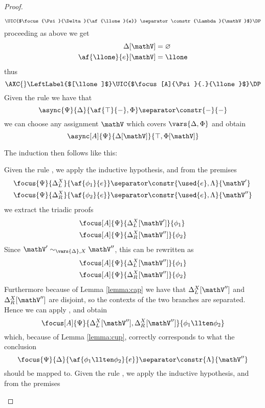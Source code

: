 \begin{proof}
\begin{itemize}
$$			\UIC{$\focus{\Psi}{\Delta}{\af{\llone}{e}} \separator \constr{\Lambda}{\mathV}$}
			\DP
			$$
			proceeding as above we get
			\begin{align*}
				\Delta[\mathV] &= \varnothing \\
				\af{\llone}{e}[\mathV] &= \llone
			\end{align*}
			thus
			$$
			\AXC{}
			\LeftLabel{$[\llone]$}
			\UIC{$\focus[A]{\Psi}{.}{\llone}$}
			\DP
			$$
		\indCase{\displaytop} Given the rule \derRule{\displaytop} we have that
			$$ \async{\Psi}{\Delta}{\af{\top}{-}, \Phi} \separator \constr{-}{-} $$
			we can choose any assignment $\mathV$ which covers $\vars{\Delta, \Phi}$ and obtain
			$$ \async[A]{\Psi}{\Delta[\mathV]}{\top, \Phi[\mathV]} $$
	\end{itemize}
	The induction then follows like this:
	\begin{itemize}
		\indCase{\displayten} Given the rule \derRule{\displayten}, we apply the inductive hypothesis, and from the premises 
			\begin{align*}
				&\focus{\Psi}{\Delta_L^X}{\af{\phi_1}{e}} \separator \constr{\used{e}, \Lambda}{\mathV'} \\
				&\focus{\Psi}{\Delta_R^X}{\af{\phi_2}{e}} \separator \constr{\used{e}, \Lambda}{\mathV''} 
			\end{align*}
			we extract the triadic proofs
			\begin{align*}
				&\focus[A]{\Psi}{\Delta_L^X[\mathV']}{\phi_1} \\
				&\focus[A]{\Psi}{\Delta_R^X[\mathV'']}{\phi_2} 
			\end{align*}
			Since $\mathV' \sim_{\vars{\Delta}, X} \mathV''$, this can be rewritten as
			\begin{align*}
				&\focus[A]{\Psi}{\Delta_L^X[\mathV'']}{\phi_1} \\
				&\focus[A]{\Psi}{\Delta_R^X[\mathV'']}{\phi_2} 
			\end{align*}
			Furthermore because of Lemma \ref{lemma:cap} we have that $\Delta_L^X[\mathV'']$ and $\Delta_R^X[\mathV'']$ are disjoint, so the contexts of the two branches are separated.
			Hence we can apply \derRule[A]{\displayten}, and obtain
			$$ \focus[A]{\Psi}{\Delta_L^X[\mathV''], \Delta_R^X[\mathV'']}{\phi_1 \llten \phi_2} $$
			which, because of Lemma \ref{lemma:cup}, correctly corresponds to what the conclusion
			$$ \focus{\Psi}{\Delta}{\af{\phi_1 \llten \phi_2}{e}} \separator \constr{\Lambda}{\mathV''} $$
			should be mapped to.
		\indCase{\displaywith} Given the rule \derRule{\displaywith}, we apply the inductive hypothesis, and from the premises

\end{itemize}
\end{proof}
